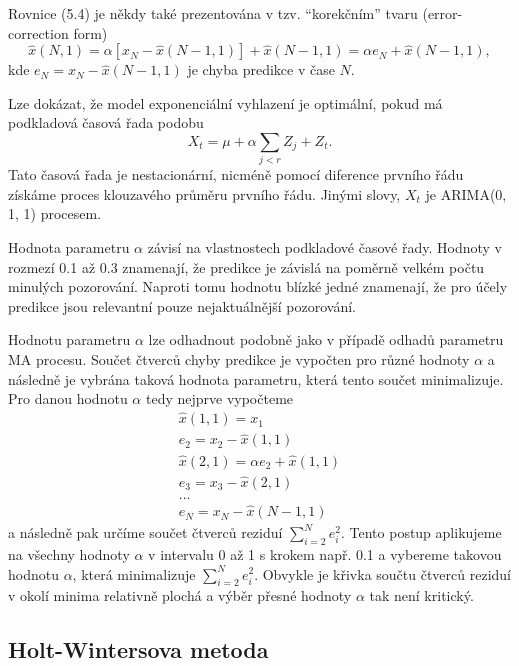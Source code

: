 Rovnice (5.4) je někdy také prezentována v tzv. ``korekčním'' tvaru (error-correction form)
\begin{equation}
\hat{x}(N, 1) = \alpha[x_N - \hat{x}(N - 1, 1)] + \hat{x}(N - 1, 1) = \alpha e_N  + \hat{x}(N - 1, 1),
\end{equation}
kde $e_N = x_N - \hat{x}(N - 1, 1)$ je chyba predikce v čase $N$.

Lze dokázat, že model exponenciální vyhlazení je optimální, pokud má podkladová časová řada podobu
\begin{equation}
X_t = \mu + \alpha \sum_{j < r}Z_j + Z_t.
\end{equation}
Tato časová řada je nestacionární, nicméně pomocí diference prvního řádu získáme proces klouzavého průměru prvního řádu. Jinými slovy, $X_t$ je ARIMA(0, 1, 1) procesem.

Hodnota parametru $\alpha$ závisí na vlastnostech podkladové časové řady. Hodnoty v rozmezí 0.1 až 0.3 znamenají, že predikce je závislá na poměrně velkém počtu minulých pozorování. Naproti tomu hodnotu blízké jedné znamenají, že pro účely predikce jsou relevantní pouze nejaktuálnější pozorování.

Hodnotu parametru $\alpha$ lze odhadnout podobně jako v případě odhadů parametru MA procesu. Součet čtverců chyby predikce je vypočten pro různé hodnoty $\alpha$ a následně je vybrána taková hodnota parametru, která tento součet minimalizuje. Pro danou hodnotu $\alpha$ tedy nejprve vypočteme
\begin{equation}
\begin{aligned}
\hat{x}(1, 1) = x_1\\
e_2 = x_2 - \hat{x}(1, 1)\\
\hat{x}(2, 1) = \alpha e_2 + \hat{x}(1, 1)\\
e_3 = x_3 - \hat{x}(2, 1)\\
...\\
e_N = x_N - \hat{x}(N - 1, 1)
\end{aligned}
\end{equation}
a následně pak určíme součet čtverců reziduí $\sum_{i = 2}^N e^2_i$. Tento postup aplikujeme na všechny hodnoty $\alpha$ v intervalu 0 až 1 s krokem např. 0.1 a vybereme takovou hodnotu $\alpha$, která minimalizuje $\sum_{i = 2}^N e^2_i$. Obvykle je křivka součtu čtverců reziduí v okolí minima relativně plochá a výběr přesné hodnoty $\alpha$ tak není kritický.

\subsection{Holt-Wintersova metoda}

